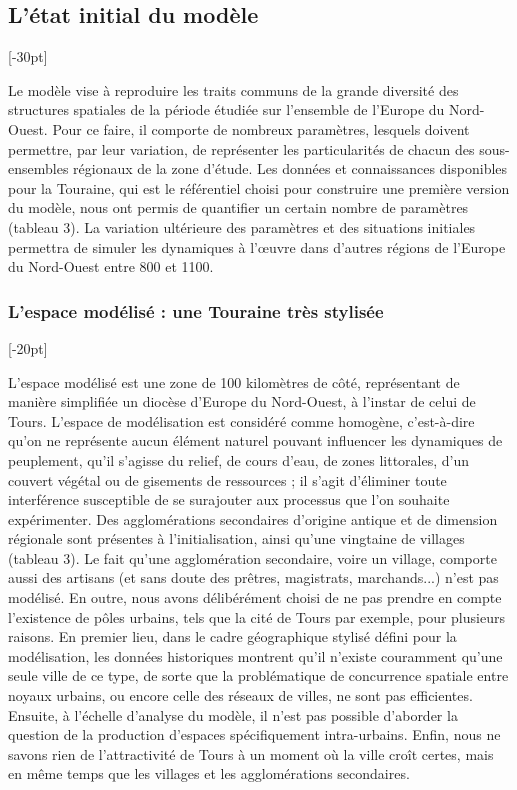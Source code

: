 \clearpage
\subsection{L'état initial du modèle}[-30pt]

Le modèle vise à reproduire les traits communs de la grande diversité des structures spatiales de la période étudiée sur l'ensemble de l'Europe du Nord-Ouest.
Pour ce faire, il comporte de nombreux paramètres, lesquels doivent permettre, par leur variation, de représenter les particularités de chacun des sous-ensembles régionaux de la zone d'étude.
Les données et connaissances disponibles pour la Touraine, qui est le référentiel choisi pour construire une première version du modèle, nous ont permis de quantifier un certain nombre de paramètres (tableau 3).
La variation ultérieure des paramètres et des situations initiales permettra de simuler les dynamiques à l'œuvre dans d'autres régions de l'Europe du Nord-Ouest entre 800 et 1100.

\subsubsection{L'espace modélisé : une Touraine très stylisée}[-20pt]

L'espace modélisé est une zone de 100 kilomètres de côté, représentant de manière simplifiée un diocèse d'Europe du Nord-Ouest, à l'instar de celui de Tours.
L'espace de modélisation est considéré comme homogène, c'est-à-dire qu'on ne représente aucun élément naturel pouvant influencer les dynamiques de peuplement, qu'il s'agisse du relief, de cours d'eau, de zones littorales, d'un couvert végétal ou de gisements de ressources ;
il s'agit d'éliminer toute interférence susceptible de se surajouter aux processus que l'on souhaite expérimenter.
Des agglomérations secondaires d'origine antique et de dimension régionale sont présentes à l'initialisation, ainsi qu'une vingtaine de villages (tableau 3).
Le fait qu'une agglomération secondaire, voire un village, comporte aussi des artisans (et sans doute des prêtres, magistrats, marchands...) n'est pas modélisé.
En outre, nous avons délibérément choisi de ne pas prendre en compte l'existence de pôles urbains, tels que la cité de Tours par exemple, pour plusieurs raisons.
En premier lieu, dans le cadre géographique stylisé défini pour la modélisation, les données historiques montrent qu'il n'existe couramment qu'une seule ville de ce type, de sorte que la problématique de concurrence spatiale entre noyaux urbains, ou encore celle des réseaux de villes, ne sont pas efficientes.
Ensuite, à l'échelle d'analyse du modèle, il n'est pas possible d'aborder la question de la production d'espaces spécifiquement intra-urbains.
Enfin, nous ne savons rien de l'attractivité de Tours à un moment où la ville croît certes, mais en même temps que les villages et les agglomérations secondaires.

